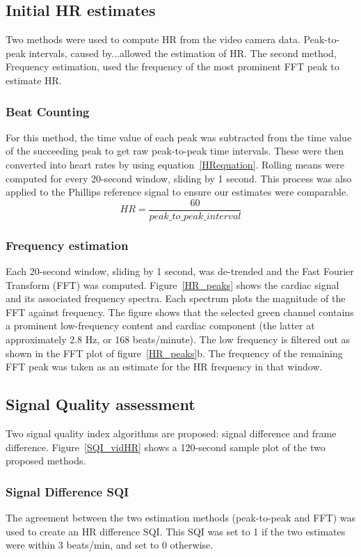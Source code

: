  \subsection{Initial HR estimates}
 Two methods were used to compute HR from the video camera data. Peak-to-peak intervals, caused by...allowed the estimation of HR. The second method, Frequency estimation, used the frequency of the most prominent FFT peak to estimate HR.

\subsubsection{Beat Counting}
For this method, the time value of each peak was subtracted from the time value of the succeeding peak to get raw peak-to-peak time intervals. These were then converted into heart rates by using equation~\ref{HRequation}. Rolling means were computed for every 20-second window, sliding by 1 second. This process was also applied to the Phillips reference signal to ensure our estimates were comparable.
\begin{equation}
    \label{HRequation}
HR = \frac{60}{peak\_to\_peak\_interval}
\end{equation}

\subsubsection{Frequency estimation}
Each 20-second window, sliding by 1 second, was de-trended and the Fast Fourier Transform (FFT) was computed. Figure~\ref{HR_peaks} shows the cardiac signal and its associated frequency spectra. Each spectrum plots the magnitude of the FFT against frequency. The figure shows that the selected green channel contains a prominent low-frequency content and cardiac component (the latter at approximately 2.8 Hz, or 168 beats/minute). The low frequency is filtered out as shown in the FFT plot of figure~\ref{HR_peaks}b. The frequency of the remaining FFT peak was taken as an estimate for the HR frequency in that window.

\subsection{Signal Quality assessment}
\label{sqis expl}
Two signal quality index algorithms are proposed: signal difference and frame difference. 
Figure~\ref{SQI_vidHR} shows a 120-second sample plot of the two proposed methods.

\subsubsection{Signal Difference SQI}
The agreement between the two estimation methods (peak-to-peak and FFT) was used to create an HR difference SQI. This SQI was set to 1 if the two estimates were within 3 beats/min, and set to 0 otherwise.

